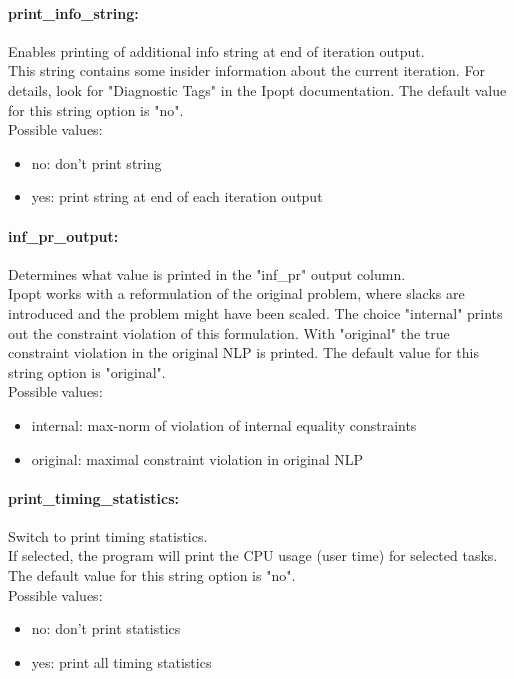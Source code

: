 \paragraph{print\_info\_string:}\label{opt:print_info_string} Enables printing of additional info string at end of iteration output. \\
 This string contains some insider information about the current iteration.  For details, look for "Diagnostic Tags" in the Ipopt documentation. The default value for this string option is "no".
\\ 
Possible values:
\begin{itemize}
   \item no: don't print string
   \item yes: print string at end of each iteration output
\end{itemize}

\paragraph{inf\_pr\_output:}\label{opt:inf_pr_output} Determines what value is printed in the "inf\_pr" output column. \\
 Ipopt works with a reformulation of the original problem, where slacks are introduced and the problem might have been scaled.  The choice "internal" prints out the constraint violation of this formulation. With "original" the true constraint violation in the original NLP is printed. The default value for this string option is "original".
\\ 
Possible values:
\begin{itemize}
   \item internal: max-norm of violation of internal equality constraints
   \item original: maximal constraint violation in original NLP
\end{itemize}

\paragraph{print\_timing\_statistics:}\label{opt:print_timing_statistics} Switch to print timing statistics. \\
 If selected, the program will print the CPU usage (user time) for selected tasks. The default value for this string option is "no".
\\ 
Possible values:
\begin{itemize}
   \item no: don't print statistics
   \item yes: print all timing statistics
\end{itemize}

